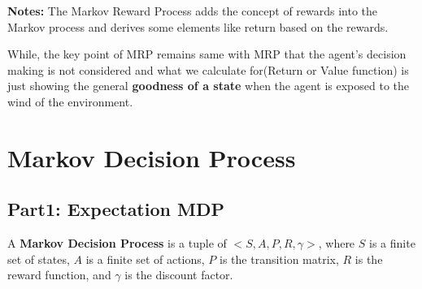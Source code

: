 \documentclass{article}
\begin{document}
\vspace{2em}
\textbf{Notes:}
The Markov Reward Process adds the concept of rewards into the Markov process and derives some elements like return based
on the rewards. 

While, the key point of MRP remains same with MRP that the agent's decision making is not considered and
what we calculate for(Return or Value function) is just showing the general \textbf{goodness of a state} when the agent is
exposed to the wind of the environment.
\section{Markov Decision Process}
\subsection{Part1: Expectation MDP}
A \textbf{Markov Decision Process} is a tuple of $<S, A, P, R, \gamma>$, where $S$ is a finite set of states, $A$ is a finite set of actions, $P$ is the transition matrix,
$R$ is the reward function, and $\gamma$ is the discount factor.
\end{document}
